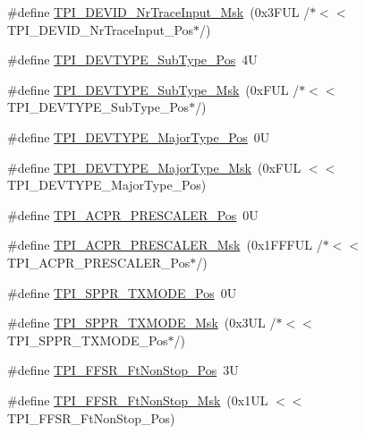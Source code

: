 \begin{DoxyCompactItemize}
\item 
\#define \mbox{\hyperlink{group___c_m_s_i_s___t_p_i_gabed454418d2140043cd65ec899abd97f}{T\+P\+I\+\_\+\+D\+E\+V\+I\+D\+\_\+\+Nr\+Trace\+Input\+\_\+\+Msk}}~(0x3\+F\+U\+L /$\ast$$<$$<$ T\+P\+I\+\_\+\+D\+E\+V\+I\+D\+\_\+\+Nr\+Trace\+Input\+\_\+\+Pos$\ast$/)
\item 
\#define \mbox{\hyperlink{group___c_m_s_i_s___t_p_i_ga0c799ff892af5eb3162d152abc00af7a}{T\+P\+I\+\_\+\+D\+E\+V\+T\+Y\+P\+E\+\_\+\+Sub\+Type\+\_\+\+Pos}}~4U
\item 
\#define \mbox{\hyperlink{group___c_m_s_i_s___t_p_i_ga5b2fd7dddaf5f64855d9c0696acd65c1}{T\+P\+I\+\_\+\+D\+E\+V\+T\+Y\+P\+E\+\_\+\+Sub\+Type\+\_\+\+Msk}}~(0x\+F\+U\+L /$\ast$$<$$<$ T\+P\+I\+\_\+\+D\+E\+V\+T\+Y\+P\+E\+\_\+\+Sub\+Type\+\_\+\+Pos$\ast$/)
\item 
\#define \mbox{\hyperlink{group___c_m_s_i_s___t_p_i_ga69c4892d332755a9f64c1680497cebdd}{T\+P\+I\+\_\+\+D\+E\+V\+T\+Y\+P\+E\+\_\+\+Major\+Type\+\_\+\+Pos}}~0U
\item 
\#define \mbox{\hyperlink{group___c_m_s_i_s___t_p_i_gaecbceed6d08ec586403b37ad47b38c88}{T\+P\+I\+\_\+\+D\+E\+V\+T\+Y\+P\+E\+\_\+\+Major\+Type\+\_\+\+Msk}}~(0x\+F\+U\+L $<$$<$ T\+P\+I\+\_\+\+D\+E\+V\+T\+Y\+P\+E\+\_\+\+Major\+Type\+\_\+\+Pos)
\item 
\#define \mbox{\hyperlink{group___c_m_s_i_s___t_p_i_ga5a82d274eb2df8b0c92dd4ed63535928}{T\+P\+I\+\_\+\+A\+C\+P\+R\+\_\+\+P\+R\+E\+S\+C\+A\+L\+E\+R\+\_\+\+Pos}}~0U
\item 
\#define \mbox{\hyperlink{group___c_m_s_i_s___t_p_i_ga4fcacd27208419929921aec8457a8c13}{T\+P\+I\+\_\+\+A\+C\+P\+R\+\_\+\+P\+R\+E\+S\+C\+A\+L\+E\+R\+\_\+\+Msk}}~(0x1\+F\+F\+F\+U\+L /$\ast$$<$$<$ T\+P\+I\+\_\+\+A\+C\+P\+R\+\_\+\+P\+R\+E\+S\+C\+A\+L\+E\+R\+\_\+\+Pos$\ast$/)
\item 
\#define \mbox{\hyperlink{group___c_m_s_i_s___t_p_i_ga0f302797b94bb2da24052082ab630858}{T\+P\+I\+\_\+\+S\+P\+P\+R\+\_\+\+T\+X\+M\+O\+D\+E\+\_\+\+Pos}}~0U
\item 
\#define \mbox{\hyperlink{group___c_m_s_i_s___t_p_i_gaca085c8a954393d70dbd7240bb02cc1f}{T\+P\+I\+\_\+\+S\+P\+P\+R\+\_\+\+T\+X\+M\+O\+D\+E\+\_\+\+Msk}}~(0x3\+U\+L /$\ast$$<$$<$ T\+P\+I\+\_\+\+S\+P\+P\+R\+\_\+\+T\+X\+M\+O\+D\+E\+\_\+\+Pos$\ast$/)
\item 
\#define \mbox{\hyperlink{group___c_m_s_i_s___t_p_i_ga9537b8a660cc8803f57cbbee320b2fc8}{T\+P\+I\+\_\+\+F\+F\+S\+R\+\_\+\+Ft\+Non\+Stop\+\_\+\+Pos}}~3U
\item 
\#define \mbox{\hyperlink{group___c_m_s_i_s___t_p_i_gaaa313f980974a8cfc7dac68c4d805ab1}{T\+P\+I\+\_\+\+F\+F\+S\+R\+\_\+\+Ft\+Non\+Stop\+\_\+\+Msk}}~(0x1\+U\+L $<$$<$ T\+P\+I\+\_\+\+F\+F\+S\+R\+\_\+\+Ft\+Non\+Stop\+\_\+\+Pos)

\end{DoxyCompactItemize}

